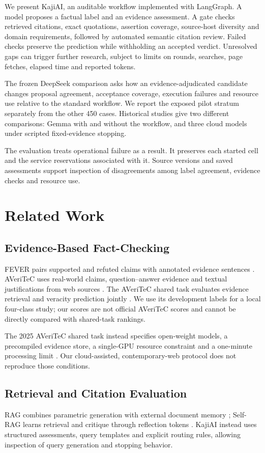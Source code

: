 \documentclass[conference]{IEEEtran}
\begin{document}
We present KajiAI, an auditable workflow implemented with LangGraph. A model proposes a factual label and an evidence assessment. A gate checks retrieved citations, exact quotations, assertion coverage, source-host diversity and domain requirements, followed by automated semantic citation review. Failed checks preserve the prediction while withholding an accepted verdict. Unresolved gaps can trigger further research, subject to limits on rounds, searches, page fetches, elapsed time and reported tokens.

The frozen DeepSeek comparison asks how an evidence-adjudicated candidate changes proposal agreement, acceptance coverage, execution failures and resource use relative to the standard workflow. We report the exposed pilot stratum separately from the other 450 cases. Historical studies give two different comparisons: Gemma with and without the workflow, and three cloud models under scripted fixed-evidence stopping.

The evaluation treats operational failure as a result. It preserves each started cell and the service reservations associated with it. Source versions and saved assessments support inspection of disagreements among label agreement, evidence checks and resource use.

\section{Related Work}
\subsection{Evidence-Based Fact-Checking}
FEVER pairs supported and refuted claims with annotated evidence sentences \cite{fever}. AVeriTeC uses real-world claims, question--answer evidence and textual justifications from web sources \cite{averitec}. The AVeriTeC shared task evaluates evidence retrieval and veracity prediction jointly \cite{sharedtask}. We use its development labels for a local four-class study; our scores are not official AVeriTeC scores and cannot be directly compared with shared-task rankings.

The 2025 AVeriTeC shared task instead specifies open-weight models, a precompiled evidence store, a single-GPU resource constraint and a one-minute processing limit \cite{sharedtask2025}. Our cloud-assisted, contemporary-web protocol does not reproduce those conditions.

\subsection{Retrieval and Citation Evaluation}
RAG combines parametric generation with external document memory \cite{rag}; Self-RAG learns retrieval and critique through reflection tokens \cite{selfrag}. KajiAI instead uses structured assessments, query templates and explicit routing rules, allowing inspection of query generation and stopping behavior.
\end{document}
